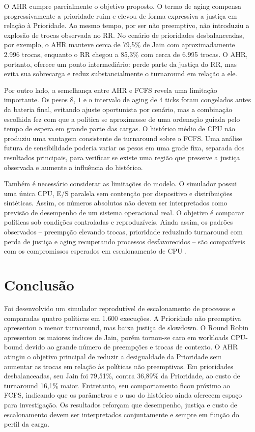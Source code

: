 \documentclass[conference]{IEEEtran}
\begin{document}
O AHR cumpre parcialmente o objetivo proposto. O termo de aging compensa progressivamente a prioridade ruim e elevou de forma expressiva a justiça em relação à Prioridade. Ao mesmo tempo, por ser não preemptivo, não introduziu a explosão de trocas observada no RR. No cenário de prioridades desbalanceadas, por exemplo, o AHR manteve cerca de 79,5\% de Jain com aproximadamente 2.996 trocas, enquanto o RR chegou a 85,3\% com cerca de 6.995 trocas. O AHR, portanto, oferece um ponto intermediário: perde parte da justiça do RR, mas evita sua sobrecarga e reduz substancialmente o turnaround em relação a ele.

Por outro lado, a semelhança entre AHR e FCFS revela uma limitação importante. Os pesos $8$, $1$ e o intervalo de aging de 4 ticks foram congelados antes da bateria final, evitando ajuste oportunista por cenário, mas a combinação escolhida fez com que a política se aproximasse de uma ordenação guiada pelo tempo de espera em grande parte das cargas. O histórico médio de CPU não produziu uma vantagem consistente de turnaround sobre o FCFS. Uma análise futura de sensibilidade poderia variar os pesos em uma grade fixa, separada dos resultados principais, para verificar se existe uma região que preserve a justiça observada e aumente a influência do histórico.

Também é necessário considerar as limitações do modelo. O simulador possui uma única CPU, E/S paralela sem contenção por dispositivo e distribuições sintéticas. Assim, os números absolutos não devem ser interpretados como previsão de desempenho de um sistema operacional real. O objetivo é comparar políticas sob condições controladas e reproduzíveis. Ainda assim, os padrões observados -- preempção elevando trocas, prioridade reduzindo turnaround com perda de justiça e aging recuperando processos desfavorecidos -- são compatíveis com os compromissos esperados em escalonamento de CPU \cite{ostep}.

\section{Conclusão}
Foi desenvolvido um simulador reprodutível de escalonamento de processos e comparadas quatro políticas em 1.600 execuções. A Prioridade não preemptiva apresentou o menor turnaround, mas baixa justiça de slowdown. O Round Robin apresentou os maiores índices de Jain, porém tornou-se caro em workloads CPU-bound devido ao grande número de preempções e trocas de contexto. O AHR atingiu o objetivo principal de reduzir a desigualdade da Prioridade sem aumentar as trocas em relação às políticas não preemptivas. Em prioridades desbalanceadas, seu Jain foi 79,51\%, contra 36,89\% da Prioridade, ao custo de turnaround 16,1\% maior. Entretanto, seu comportamento ficou próximo ao FCFS, indicando que os parâmetros e o uso do histórico ainda oferecem espaço para investigação. Os resultados reforçam que desempenho, justiça e custo de escalonamento devem ser interpretados conjuntamente e sempre em função do perfil da carga.
\end{document}
